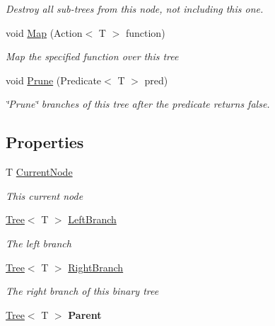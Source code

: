 \begin{DoxyCompactItemize}
\begin{DoxyCompactList}\small\item\em Destroy all sub-\/trees from this node, not including this one. \end{DoxyCompactList}\item 
void \hyperlink{classHumDrum_1_1Structures_1_1Tree_af9683137e7eca637f2d06c1791ddb880}{Map} (Action$<$ T $>$ function)
\begin{DoxyCompactList}\small\item\em Map the specified function over this tree \end{DoxyCompactList}\item 
void \hyperlink{classHumDrum_1_1Structures_1_1Tree_a0cdb68fb23ac6a3c144fa112c5d168ff}{Prune} (Predicate$<$ T $>$ pred)
\begin{DoxyCompactList}\small\item\em \char`\"{}\+Prune\char`\"{} branches of this tree after the predicate returns false. \end{DoxyCompactList}\end{DoxyCompactItemize}
\subsection*{Properties}
\begin{DoxyCompactItemize}
\item 
T \hyperlink{classHumDrum_1_1Structures_1_1Tree_af2d1d062002b9ffbb3587f69f2b03175}{Current\+Node}
\begin{DoxyCompactList}\small\item\em This current node \end{DoxyCompactList}\item 
\hyperlink{classHumDrum_1_1Structures_1_1Tree}{Tree}$<$ T $>$ \hyperlink{classHumDrum_1_1Structures_1_1Tree_a713658d58f7222e2b3de4878f74abcf2}{Left\+Branch}
\begin{DoxyCompactList}\small\item\em The left branch \end{DoxyCompactList}\item 
\hyperlink{classHumDrum_1_1Structures_1_1Tree}{Tree}$<$ T $>$ \hyperlink{classHumDrum_1_1Structures_1_1Tree_a2b0d1d71d45216c34d14479b04a6c7a8}{Right\+Branch}
\begin{DoxyCompactList}\small\item\em The right branch of this binary tree \end{DoxyCompactList}\item 
\hypertarget{classHumDrum_1_1Structures_1_1Tree_ab9c1b5646424bc2926a944a64bd952c2}{}\hyperlink{classHumDrum_1_1Structures_1_1Tree}{Tree}$<$ T $>$ {\bfseries Parent}\label{classHumDrum_1_1Structures_1_1Tree_ab9c1b5646424bc2926a944a64bd952c2}

\end{DoxyCompactItemize}


